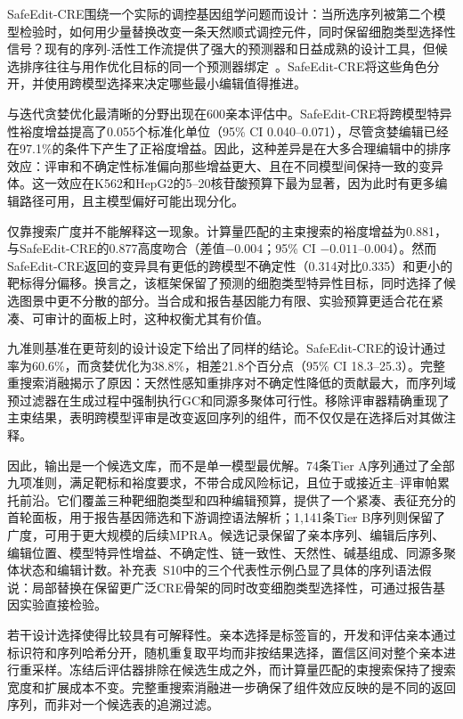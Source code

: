 SafeEdit-CRE围绕一个实际的调控基因组学问题而设计：当所选序列被第二个模型检验时，如何用少量替换改变一条天然顺式调控元件，同时保留细胞类型选择性信号？现有的序列-活性工作流提供了强大的预测器和日益成熟的设计工具，但候选排序往往与用作优化目标的同一个预测器绑定~\citep{Whalen2022,deBoer2024,Rafi2025}。SafeEdit-CRE将这些角色分开，并使用跨模型选择来决定哪些最小编辑值得推进。

与迭代贪婪优化最清晰的分野出现在600亲本评估中。SafeEdit-CRE将跨模型特异性裕度增益提高了0.055个标准化单位（95\% CI 0.040--0.071），尽管贪婪编辑已经在97.1\%的条件下产生了正裕度增益。因此，这种差异是在大多合理编辑中的排序效应：评审和不确定性标准偏向那些增益更大、且在不同模型间保持一致的变异体。这一效应在K562和HepG2的5--20核苷酸预算下最为显著，因为此时有更多编辑路径可用，且主模型偏好可能出现分化。

仅靠搜索广度并不能解释这一现象。计算量匹配的主束搜索的裕度增益为0.881，与SafeEdit-CRE的0.877高度吻合（差值$-0.004$；95\% CI $-0.011$--$0.004$）。然而SafeEdit-CRE返回的变异具有更低的跨模型不确定性（0.314对比0.335）和更小的靶标得分偏移。换言之，该框架保留了预测的细胞类型特异性目标，同时选择了候选图景中更不分散的部分。当合成和报告基因能力有限、实验预算更适合花在紧凑、可审计的面板上时，这种权衡尤其有价值。

九准则基准在更苛刻的设计设定下给出了同样的结论。SafeEdit-CRE的设计通过率为60.6\%，而贪婪优化为38.8\%，相差21.8个百分点（95\% CI 18.3--25.3）。完整重搜索消融揭示了原因：天然性感知重排序对不确定性降低的贡献最大，而序列域预过滤器在生成过程中强制执行GC和同源多聚体可行性。移除评审器精确重现了主束结果，表明跨模型评审是改变返回序列的组件，而不仅仅是在选择后对其做注释。

因此，输出是一个候选文库，而不是单一模型最优解。74条Tier A序列通过了全部九项准则，满足靶标和裕度要求，不带合成风险标记，且位于或接近主--评审帕累托前沿。它们覆盖三种靶细胞类型和四种编辑预算，提供了一个紧凑、表征充分的首轮面板，用于报告基因筛选和下游调控语法解析；1,141条Tier B序列则保留了广度，可用于更大规模的后续MPRA。候选记录保留了亲本序列、编辑后序列、编辑位置、模型特异性增益、不确定性、链一致性、天然性、碱基组成、同源多聚体状态和编辑计数。补充表~S10中的三个代表性示例凸显了具体的序列语法假说：局部替换在保留更广泛CRE骨架的同时改变细胞类型选择性，可通过报告基因实验直接检验。

若干设计选择使得比较具有可解释性。亲本选择是标签盲的，开发和评估亲本通过标识符和序列哈希分开，随机重复取平均而非按结果选择，置信区间对整个亲本进行重采样。冻结后评估器排除在候选生成之外，而计算量匹配的束搜索保持了搜索宽度和扩展成本不变。完整重搜索消融进一步确保了组件效应反映的是不同的返回序列，而非对一个候选表的追溯过滤。

